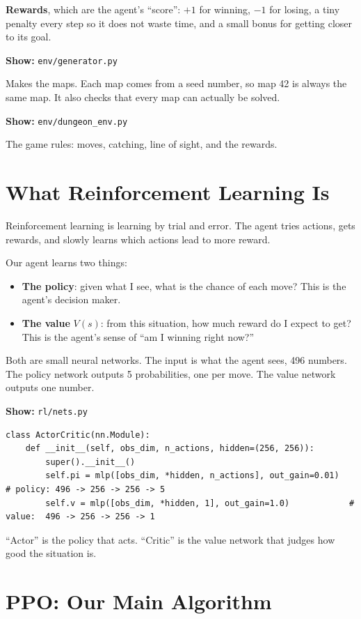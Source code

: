 \documentclass[11pt,a4paper]{article}
\newcommand{\code}[1]{\texttt{#1}}
\newcommand{\showfile}[1]{\par\noindent\textbf{Show:} \code{#1}\par}
\begin{document}
\textbf{Rewards}, which are the agent's ``score'': $+1$ for winning, $-1$ for losing, a tiny penalty
every step so it does not waste time, and a small bonus for getting closer to its goal.

\showfile{env/generator.py}
Makes the maps. Each map comes from a seed number, so map 42 is always the same map. It also
checks that every map can actually be solved.

\showfile{env/dungeon\_env.py}
The game rules: moves, catching, line of sight, and the rewards.

\section{What Reinforcement Learning Is}
Reinforcement learning is learning by trial and error. The agent tries actions, gets rewards,
and slowly learns which actions lead to more reward.

Our agent learns two things:
\begin{itemize}
  \item \textbf{The policy}: given what I see, what is the chance of each move? This is the agent's
        decision maker.
  \item \textbf{The value} $V(s)$: from this situation, how much reward do I expect to get? This
        is the agent's sense of ``am I winning right now?''
\end{itemize}
Both are small neural networks. The input is what the agent sees, 496 numbers. The policy
network outputs 5 probabilities, one per move. The value network outputs one number.

\showfile{rl/nets.py}
\begin{lstlisting}
class ActorCritic(nn.Module):
    def __init__(self, obs_dim, n_actions, hidden=(256, 256)):
        super().__init__()
        self.pi = mlp([obs_dim, *hidden, n_actions], out_gain=0.01)   # policy: 496 -> 256 -> 256 -> 5
        self.v = mlp([obs_dim, *hidden, 1], out_gain=1.0)            # value:  496 -> 256 -> 256 -> 1
\end{lstlisting}
``Actor'' is the policy that acts. ``Critic'' is the value network that judges how good the
situation is.

\section{PPO: Our Main Algorithm}
\end{document}

